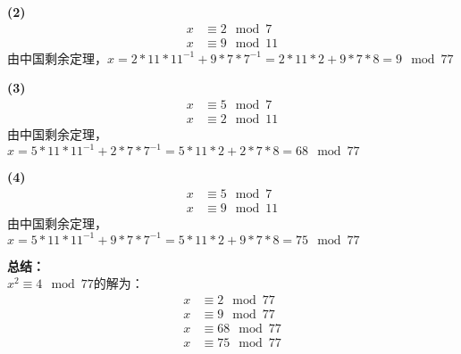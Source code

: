 \documentclass[a4paper]{CINTA}
\begin{document}
\textbf{(2)}\\
\begin{align*}
    x &\equiv 2 \mod 7\\
    x &\equiv 9 \mod 11
\end{align*}
由中国剩余定理，$x = 2 * 11 * 11^{-1} + 9 * 7 * 7^{-1} = 2 * 11 * 2 + 9 * 7 * 8 = 9 \mod{77}$

\textbf{(3)}\\
\begin{align*}
    x &\equiv 5 \mod 7\\
    x &\equiv 2 \mod 11
\end{align*}
由中国剩余定理，$x = 5 * 11 * 11^{-1} + 2 * 7 * 7^{-1} = 5 * 11 * 2 + 2 * 7 * 8 = 68 \mod{77}$

\textbf{(4)}\\
\begin{align*}
    x &\equiv 5 \mod 7\\
    x &\equiv 9 \mod 11
\end{align*}
由中国剩余定理，$x = 5 * 11 * 11^{-1} + 9 * 7 * 7^{-1} = 5 * 11 * 2 + 9 * 7 * 8 = 75 \mod{77}$

\textbf{总结：}\\
$x^2 \equiv 4 \mod 77$的解为：\\
\begin{align*}
    x &\equiv 2 \mod 77\\
    x &\equiv 9 \mod 77\\
    x &\equiv 68 \mod 77\\
    x &\equiv 75 \mod 77
\end{align*}
\end{document}
